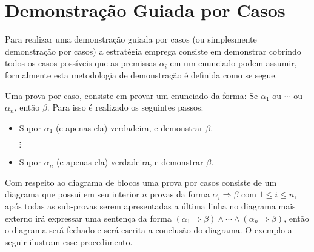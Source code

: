 \section{Demonstração Guiada por Casos}

Para realizar uma demonstração guiada por casos (ou simplesmente demonstração por casos) a estratégia emprega consiste em demonstrar cobrindo todos os casos possíveis que as premissas  $\alpha_i$ em um enunciado podem assumir, formalmente esta metodologia de demonstração é definida como se segue.

\begin{definicao}\label{metodo:PorCasos}
	Uma prova por caso, consiste em provar um enunciado da forma: Se $\alpha_1$ ou $\cdots$ ou $\alpha_n$, então $\beta$. Para isso é realizado os seguintes passos:
	\begin{itemize}
		\item Supor $\alpha_1$ (e apenas ela) verdadeira, e demonstrar $\beta$.
		
		$\vdots$
		
		\item Supor $\alpha_n$ (e apenas ela) verdadeira, e demonstrar $\beta$.
	\end{itemize}
\end{definicao}


Com respeito ao diagrama de blocos uma prova por casos consiste de um diagrama que possui em seu interior $n$ provas da forma $\alpha_i \Rightarrow \beta$ com $1 \leq i \leq n$, após todas as sub-provas serem apresentadas a última linha no diagrama mais externo irá expressar uma sentença da forma $(\alpha_1 \Rightarrow \beta) \land \cdots \land (\alpha_n \Rightarrow \beta)$, então o diagrama será fechado e será escrita a conclusão do diagrama. O exemplo a seguir ilustram esse procedimento.



